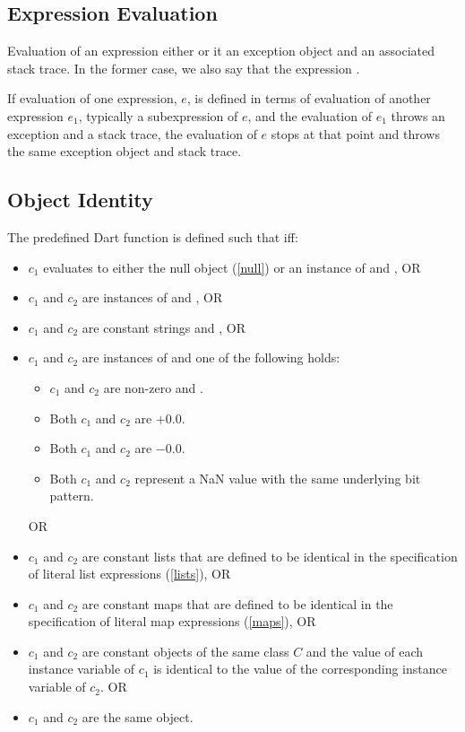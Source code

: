 \documentclass[makeidx]{article}
\begin{document}
{\subsection{Expression Evaluation}

\LMHash{}%
Evaluation of an expression either
or it
an exception object and an associated stack trace.
In the former case, we also say that the expression
.

\LMHash{}%
If evaluation of one expression, $e$,
is defined in terms of evaluation of another expression $e_1$,
typically a subexpression of $e$,
and the evaluation of $e_1$ throws an exception and a stack trace,
the evaluation of $e$ stops at that point
and throws the same exception object and stack trace.


\subsection{Object Identity}

\LMHash{}%
The predefined Dart function 
is defined such that  if{}f:

\begin{itemize}
\item $c_1$ evaluates to either the null object (\ref{null})
  or an instance of  and , OR
\item $c_1$ and $c_2$ are instances of  and , OR
\item $c_1$ and $c_2$ are constant strings and , OR
\item $c_1$ and $c_2$ are instances of 
  and one of the following holds:

  \begin{itemize}
  \item $c_1$ and $c_2$ are non-zero and .
  \item Both $c_1$ and $c_2$ are $+0.0$.
  \item Both $c_1$ and $c_2$ are $-0.0$.
  \item Both $c_1$ and $c_2$ represent a NaN value
    with the same underlying bit pattern.
  \end{itemize}
 OR
\item $c_1$ and $c_2$ are constant lists that are defined to be identical
  in the specification of literal list expressions (\ref{lists}), OR
\item $c_1$ and $c_2$ are constant maps that are defined to be identical
  in the specification of literal map expressions (\ref{maps}), OR
\item $c_1$ and $c_2$ are constant objects of the same class $C$
  and the value of each instance variable of $c_1$ is identical to
  the value of the corresponding instance variable of $c_2$. OR
\item $c_1$ and $c_2$ are the same object.
\end{itemize}

}
\end{document}
